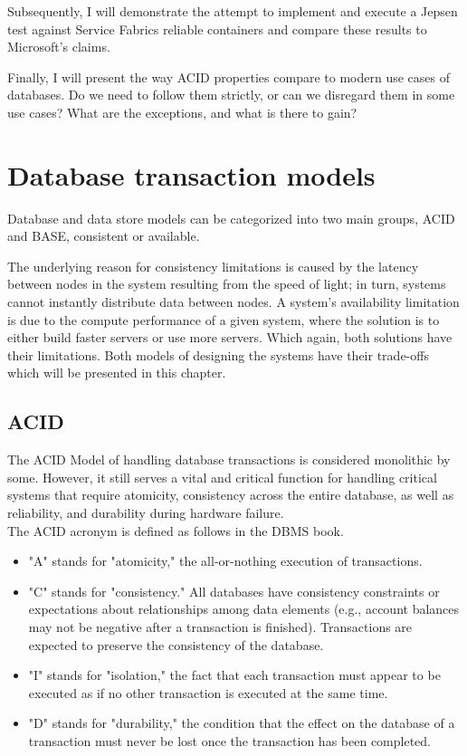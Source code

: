 \documentclass[a4paper,10pt,titlepage]{report}
\begin{document}
    Subsequently,  I will demonstrate the attempt to implement and execute a Jepsen test against Service Fabrics reliable containers and compare these results to Microsoft's claims.\\
    \vspace{5mm}

    Finally, I will present the way ACID properties compare to modern use cases of databases. Do we need to follow them strictly, or can we disregard them in some use cases? What are the exceptions, and what is there to gain?\\


    \chapter{Database transaction models}

    Database and data store models can be categorized into two main groups, ACID and BASE,  consistent or available.

    The underlying reason for consistency limitations is caused by the latency between nodes in the system resulting from the speed of light; in turn, systems cannot instantly distribute data between nodes. A system's availability limitation is due to the compute performance of a given system, where the solution is to either build faster servers or use more servers. Which again, both solutions have their limitations. Both models of designing the systems have their trade-offs which will be presented in this chapter.


    \section{ACID}
    The ACID Model of handling database transactions is considered monolithic by some. However, it still serves a vital and critical function for handling critical systems that require atomicity, consistency across the entire database, as well as reliability, and durability during hardware failure.\\
    \vspace{5mm}
    The ACID acronym is defined as follows in the DBMS book\cite{DBMSbook}.

    \begin{itemize}
        \item "A" stands for "atomicity," the all-or-nothing execution of transactions.
        \item "C" stands for "consistency." All databases have consistency constraints or expectations about relationships among data elements (e.g., account balances may not be negative after a transaction is finished). Transactions are expected to preserve the consistency of the database.
        \item "I" stands for "isolation," the fact that each transaction must appear to be executed as if no other transaction is executed at the same time.
        \item "D" stands for "durability," the condition that the effect on the database of a transaction must never be lost once the transaction has been completed.
    \end{itemize}
\end{document}
